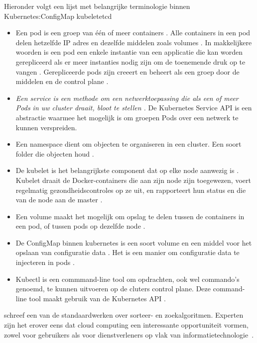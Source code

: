 Hieronder volgt een lijst met belangrijke terminologie binnen Kubernetes:ConfigMap
kubeletetcd
\begin{itemize}
    \item Een pod is een groep van één of meer containers \autocite{habbal-2020}. Alle containers in een pod delen hetzelfde IP adres en dezelfde middelen zoals volumes \textcite{hohn-2020}. In makkelijkere woorden is een pod een enkele instantie van een applicatie die kan worden gerepliceerd als er meer instanties nodig zijn om de toenemende druk op te vangen \textcite{habbal-2020}. Gerepliceerde pods zijn creeert en beheert als een groep door de middelen en de control plane \textcite{kubernetesDocs-2022}. 
    \item \textit{Een service is een methode om een netwerktoepassing die als een of meer Pods in uw cluster draait, bloot te stellen \autocite{kubernetesDocs-2022}.} De Kubernetes Service API is een abstractie waarmee het mogelijk is om groepen Pods over een netwerk te kunnen verspreiden. 
    \item Een namespace dient om objecten te organiseren in een cluster. Een soort folder die objecten houd \autocite{burns2022kubernetes}.  
    \item De kubelet is het belangrijkste component dat op elke node aanwezig is \autocite{vayghan2019kubernetes}. Kubelet draait de Docker-containers die aan zijn node zijn toegewezen, voert regelmatig gezondheidscontroles op ze uit, en rapporteert hun status en die van de node aan de master \autocite{vayghan2019kubernetes}.
    \item Een volume maakt het mogelijk om opslag te delen tussen de containers in een pod, of tussen pods op dezelfde node \autocite{baier2017getting}.
    \item De ConfigMap binnen kubernetes is een soort volume en een middel voor het opslaan van configuratie data \autocite{kubernetesDocs-2023}. Het is een manier om configuratie data te injecteren in pods \autocite{kubernetesDocs-2023}.
    \item Kubectl is een commmand-line tool om opdrachten, ook wel commando's genoemd, te kunnen uitvoeren op de cluters control plane. Deze command-line tool maakt gebruik van de Kubernetes API \autocite{kubernetesDocs-2023}. 
\end{itemize}
 










\textcite{Knuth1998} schreef een van de standaardwerken over sorteer- en zoekalgoritmen. Experten zijn het erover eens dat cloud computing een interessante opportuniteit vormen, zowel voor gebruikers als voor dienstverleners op vlak van informatietechnologie~\autocite{Creeger2009}.

\lipsum[7-20]
